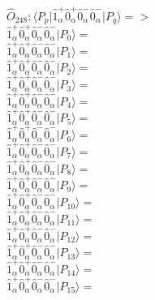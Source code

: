 \documentclass[14pt]{article}
\begin{document}
    $\hat{O}_{248}:  \langle{P_p}\vert \hat{1}_{\alpha}^{+}\hat{0}_{\alpha}^{+}\hat{0}_{\alpha}^{-}\hat{0}_{\alpha}^{-} \vert{P_q}\rangle => $ \\ 
    $ \hat{1}_{\alpha}^{+}\hat{0}_{\alpha}^{+}\hat{0}_{\alpha}^{-}\hat{0}_{\alpha}^{-} \vert{P_{0}}\rangle =  $ \\ 
    $ \hat{1}_{\alpha}^{+}\hat{0}_{\alpha}^{+}\hat{0}_{\alpha}^{-}\hat{0}_{\alpha}^{-} \vert{P_{1}}\rangle =  $ \\ 
    $ \hat{1}_{\alpha}^{+}\hat{0}_{\alpha}^{+}\hat{0}_{\alpha}^{-}\hat{0}_{\alpha}^{-} \vert{P_{2}}\rangle =  $ \\ 
    $ \hat{1}_{\alpha}^{+}\hat{0}_{\alpha}^{+}\hat{0}_{\alpha}^{-}\hat{0}_{\alpha}^{-} \vert{P_{3}}\rangle =  $ \\ 
    $ \hat{1}_{\alpha}^{+}\hat{0}_{\alpha}^{+}\hat{0}_{\alpha}^{-}\hat{0}_{\alpha}^{-} \vert{P_{4}}\rangle =  $ \\ 
    $ \hat{1}_{\alpha}^{+}\hat{0}_{\alpha}^{+}\hat{0}_{\alpha}^{-}\hat{0}_{\alpha}^{-} \vert{P_{5}}\rangle =  $ \\ 
    $ \hat{1}_{\alpha}^{+}\hat{0}_{\alpha}^{+}\hat{0}_{\alpha}^{-}\hat{0}_{\alpha}^{-} \vert{P_{6}}\rangle =  $ \\ 
    $ \hat{1}_{\alpha}^{+}\hat{0}_{\alpha}^{+}\hat{0}_{\alpha}^{-}\hat{0}_{\alpha}^{-} \vert{P_{7}}\rangle =  $ \\ 
    $ \hat{1}_{\alpha}^{+}\hat{0}_{\alpha}^{+}\hat{0}_{\alpha}^{-}\hat{0}_{\alpha}^{-} \vert{P_{8}}\rangle =  $ \\ 
    $ \hat{1}_{\alpha}^{+}\hat{0}_{\alpha}^{+}\hat{0}_{\alpha}^{-}\hat{0}_{\alpha}^{-} \vert{P_{9}}\rangle =  $ \\ 
    $ \hat{1}_{\alpha}^{+}\hat{0}_{\alpha}^{+}\hat{0}_{\alpha}^{-}\hat{0}_{\alpha}^{-} \vert{P_{10}}\rangle =  $ \\ 
    $ \hat{1}_{\alpha}^{+}\hat{0}_{\alpha}^{+}\hat{0}_{\alpha}^{-}\hat{0}_{\alpha}^{-} \vert{P_{11}}\rangle =  $ \\ 
    $ \hat{1}_{\alpha}^{+}\hat{0}_{\alpha}^{+}\hat{0}_{\alpha}^{-}\hat{0}_{\alpha}^{-} \vert{P_{12}}\rangle =  $ \\ 
    $ \hat{1}_{\alpha}^{+}\hat{0}_{\alpha}^{+}\hat{0}_{\alpha}^{-}\hat{0}_{\alpha}^{-} \vert{P_{13}}\rangle =  $ \\ 
    $ \hat{1}_{\alpha}^{+}\hat{0}_{\alpha}^{+}\hat{0}_{\alpha}^{-}\hat{0}_{\alpha}^{-} \vert{P_{14}}\rangle =  $ \\ 
    $ \hat{1}_{\alpha}^{+}\hat{0}_{\alpha}^{+}\hat{0}_{\alpha}^{-}\hat{0}_{\alpha}^{-} \vert{P_{15}}\rangle =  $ \\ 
    
\end{document}
